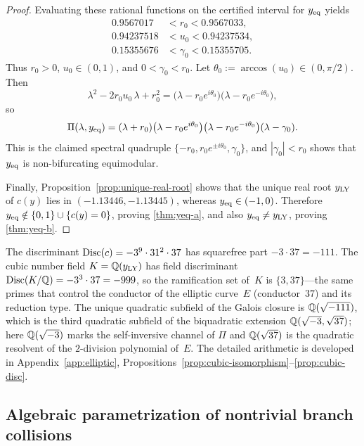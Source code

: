 \begin{proof}
Evaluating these rational functions on the certified interval for \(y_{\mathrm{eq}}\) yields
\[
\begin{aligned}
0.9567017&<r_0<0.9567033,\\
0.94237518&<u_0<0.94237534,\\
0.15355676&<\gamma_0<0.15355705.
\end{aligned}
\]
Thus \(r_0>0\), \(u_0\in(0,1)\), and \(0<\gamma_0<r_0\).
Let \(\theta_0:=\arccos(u_0)\in(0,\pi/2)\).
Then
\[
\lambda^2-2r_0u_0\,\lambda+r_0^2
=\bigl(\lambda-r_0e^{i\theta_0}\bigr)\bigl(\lambda-r_0e^{-i\theta_0}\bigr),
\]
so
\[
\Pi(\lambda,y_{\mathrm{eq}})
=(\lambda+r_0)\bigl(\lambda-r_0e^{i\theta_0}\bigr)\bigl(\lambda-r_0e^{-i\theta_0}\bigr)(\lambda-\gamma_0).
\]
This is the claimed spectral quadruple
\(\{-r_0,r_0e^{\pm i\theta_0},\gamma_0\}\), and \(|\gamma_0|<r_0\) shows that \(y_{\mathrm{eq}}\) is non-bifurcating equimodular.

Finally, Proposition~\ref{prop:unique-real-root} shows that the unique real root \(y_{\mathrm{LY}}\) of \(c(y)\) lies in \((-1.13446,-1.13445)\), whereas \(y_{\mathrm{eq}}\in(-1,0)\).
Therefore \(y_{\mathrm{eq}}\notin\{0,1\}\cup\{c(y)=0\}\), proving \eqref{thm:yeq-a}, and also \(y_{\mathrm{eq}}\neq y_{\mathrm{LY}}\), proving \eqref{thm:yeq-b}.
\end{proof}

\begin{remark}\label{rmk:branch-cubic-arithmetic}
The discriminant $\operatorname{Disc}(c)=-3^9\cdot 31^2\cdot 37$ has squarefree part $-3\cdot 37=-111$.
The cubic number field $K=\mathbb{Q}(y_{\mathrm{LY}})$ has field discriminant $\operatorname{Disc}(K/\mathbb{Q})=-3^3\cdot 37=-999$, so the ramification set of~$K$ is $\{3,37\}$---the same primes that control the conductor of the elliptic curve~$E$ (conductor~$37$) and its reduction type.
The unique quadratic subfield of the Galois closure is $\mathbb{Q}(\sqrt{-111})$, which is the third quadratic subfield of the biquadratic extension $\mathbb{Q}(\sqrt{-3},\sqrt{37})$; here $\mathbb{Q}(\sqrt{-3})$ marks the self-inversive channel of $\Pi$ and $\mathbb{Q}(\sqrt{37})$ is the quadratic resolvent of the $2$-division polynomial of~$E$.
The detailed arithmetic is developed in Appendix~\ref{app:elliptic}, Propositions~\ref{prop:cubic-isomorphism}--\ref{prop:cubic-disc}.
\end{remark}

\subsection{Algebraic parametrization of nontrivial branch collisions}

